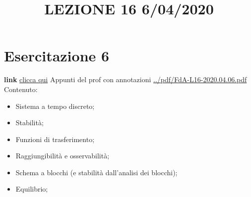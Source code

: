 \section{Esercitazione 6}
\title{LEZIONE 16 6/04/2020}\newline
\textbf{link} \href{https://web.microsoftstream.com/video/0384d9d2-5ddc-4381-8933-f46dc8fca4d3?list=user&userId=faa91214-a6f5-40d7-8875-253fd49b8ce1}{clicca qui}\newline
\newline
Appunti del prof con annotazioni \url{../pdf/FdA-L16-2020.04.06.pdf}\newline
Contenuto:
\begin{itemize}
    \item Sistema a tempo discreto;
    \item Stabilità;
    \item Funzioni di trasferimento;
    \item Raggiungibilità e osservabilità;
    \item Schema a blocchi (e stabilità dall'analisi dei blocchi);
    \item Equilibrio;
\end{itemize}
